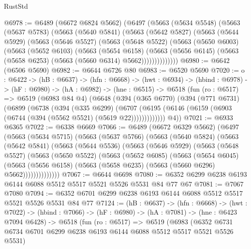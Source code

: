 \begin{lexlean}{RustStd}
\begin{coremodule}
{\begin{coremodule}
{{{{{{{{{{@6978 := @6489
    (@6672 @6824 @5662)
    (@6497
      (@5663
        (@5634 @5548)
        (@5663
          (@5637 @5783)
          (@5663
            (@5640 @5841)
            (@5663
              (@5642 @5827)
              (@5663
                (@5644 @5929)
                (@5663
                  (@5646 @5527)
                  (@5663
                    (@5648 @5522)
                    (@5663
                      (@5650 @6003)
                      (@5663
                        (@5652 @6103)
                        (@5663
                          (@5654 @6158)
                          (@5663
                            (@5656 @6145)
                            (@5663 (@5658 @6253) (@5663 (@5660 @6314) @5662))))))))))))))
@6980 := @6642 (@6506 @5690)
@6982 := @6644 @6726 @80
@6983 := @6520 @5690
@7020 := {o : @6422} ->
  (hB : @6637) ->
  (hfn : @6668) ->
  (hwt : @6934) ->
  (hbind : @6978) ->
  (hF : @6980) ->
  (hA : @6982) ->
  (hne : @6515) ->
  @6518
    (fun (ro : @6517) =>
    @6519
      (@6983 @84 @4)
      (@6648
        (@394
          (@365 @6770)
          (@394
            (@771 @6731)
            (@6899
              (@6738
                (@394
                  (@335 @6299)
                  (@6707
                    (@6195 (@6146 (@6159 (@6903 (@6744 (@394 (@5562 @5521) (@5619 @22)))))))))))))
        @4))
@7021 := @6933 @6365
@7022 := @6338 @6669
@7066 := @6489
    (@6672 @6329 @5662)
    (@6497
      (@5663
        (@5634 @5715)
        (@5663
          (@5637 @5766)
          (@5663
            (@5640 @5824)
            (@5663
              (@5642 @5841)
              (@5663
                (@5644 @5536)
                (@5663
                  (@5646 @5929)
                  (@5663
                    (@5648 @5527)
                    (@5663
                      (@5650 @5522)
                      (@5663
                        (@5652 @6085)
                        (@5663
                          (@5654 @6045)
                          (@5663
                            (@5656 @6158)
                            (@5663 (@5658 @6235) (@5663 (@5660 @6296) @5662))))))))))))))
@7067 := @6644 @6698
@7080 := @6352 @6299 @6238 @6193 @6144 @6088 @5512 @5517 @5521 @5526 @5531 @84 @77 @67
@7081 := @7067 @7080
@7094 := @6352 @6701 @6299 @6238 @6193 @6144 @6088 @5512 @5517 @5521 @5526 @5531 @84 @77
@7124 := (hB : @6637) ->
  (hfn : @6668) ->
  (hwt : @7022) ->
  (hbind : @7066) ->
  (hF : @6980) ->
  (hA : @7081) ->
  (hne : @6423 @7094 @6428) ->
  @6518
    (fun (ro : @6517) =>
    @6519
      (@6983
        (@6352 @6731 @6734 @6701 @6299 @6238 @6193 @6144 @6088 @5512 @5517 @5521 @5526 @5531)
}}}}}}}}}}
\end{coremodule}}
\end{coremodule}
\end{lexlean}
